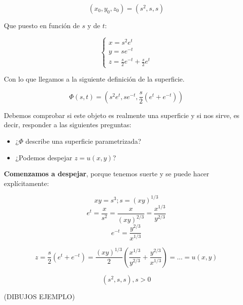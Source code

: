 \begin{example}{1}
		$$(x_0,y_0,z_0) = (s^2,s,s)$$

		Que puesto en función de $s$ y de $t$:

		\begin{equation*}
			\left\{
			\begin{array}{l}
				x = s^2 e^t \\
				y = se^{-t} \\
				z = \frac{s}{2}e^{-t} + \frac{s}{2}e^{t}
			\end{array}
			\right.
		\end{equation*}

		Con lo que llegamos a la siguiente definición de la superficie.

		$$ \Phi(s,t) = (s^2e^t, se^{-t}, \frac{s}{2}(e^t + e^{-t}))$$

		Debemos comprobar si este objeto es realmente una superficie y si nos sirve, es decir, responder a las siguientes preguntas:

		\begin{itemize}
			\item ¿$\Phi$ describe una superficie parametrizada?
			\item ¿Podemos despejar $z=u(x,y)$?
		\end{itemize}

		\textbf{Comenzamos a despejar}, porque tenemos suerte y se puede hacer explícitamente:

		$$xy = s^3; s=(xy)^{1/3}$$
		$$e^t = \frac{x}{s^2} = \frac{x}{(xy)^{2/3}} = \frac{x^{1/3}}{y^{2/3}}$$
		$$e^{-t} = \frac{y^{2/3}}{x^{1/3}}$$

		$$z = \frac{s}{2}(e^{t}+e^{-t}) = \frac{(xy)^{1/3}}{2} (\frac{x^{1/3}}{y^{2/3}}+\frac{y^{2/3}}{x^{1/3}}) = … = u(x,y) $$

		$$(s^2,s,s), s > 0$$

		(DIBUJOS EJEMPLO)

	\end{example}

